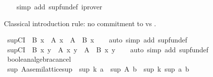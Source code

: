 \begin{isabellebody}
%
\isadelimproof
\ \ %
\endisadelimproof
%
\isatagproof
{}\isamarkupfalse%
\ {\isacharparenleft}{\kern0pt}simp\ add{\isacharcolon}{\kern0pt}\ sup{\isacharunderscore}{\kern0pt}fun{\isacharunderscore}{\kern0pt}def{\isacharparenright}{\kern0pt}\ iprover%
\endisatagproof
{\isafoldproof}%
%
\isadelimproof
%
\endisadelimproof
%
\begin{isamarkuptext}%
\medskip Classical introduction rule: no commitment to  vs .%
\end{isamarkuptext}\isamarkuptrue%
\isamarkupfalse%
\ sup{}CI{\isacharcolon}{\kern0pt}\ {\isachardoublequoteopen}{\isacharparenleft}{\kern0pt}{\isasymnot}\ B\ x\ {\isasymLongrightarrow}\ A\ x{\isacharparenright}{\kern0pt}\ {\isasymLongrightarrow}\ {\isacharparenleft}{\kern0pt}A\ {\isasymsqunion}\ B{\isacharparenright}{\kern0pt}\ x{\isachardoublequoteclose}\isanewline
%
\isadelimproof
\ \ %
\endisadelimproof
%
\isatagproof
{}\isamarkupfalse%
\ {\isacharparenleft}{\kern0pt}auto\ simp\ add{\isacharcolon}{\kern0pt}\ sup{\isacharunderscore}{\kern0pt}fun{\isacharunderscore}{\kern0pt}def{\isacharparenright}{\kern0pt}%
\endisatagproof
{\isafoldproof}%
%
\isadelimproof
\isanewline
%
\endisadelimproof
\isanewline
{}\isamarkupfalse%
\ sup{}CI{\isacharcolon}{\kern0pt}\ {\isachardoublequoteopen}{\isacharparenleft}{\kern0pt}{\isasymnot}\ B\ x\ y\ {\isasymLongrightarrow}\ A\ x\ y{\isacharparenright}{\kern0pt}\ {\isasymLongrightarrow}\ {\isacharparenleft}{\kern0pt}A\ {\isasymsqunion}\ B{\isacharparenright}{\kern0pt}\ x\ y{\isachardoublequoteclose}\isanewline
%
\isadelimproof
\ \ %
\endisadelimproof
%
\isatagproof
{}\isamarkupfalse%
\ {\isacharparenleft}{\kern0pt}auto\ simp\ add{\isacharcolon}{\kern0pt}\ sup{\isacharunderscore}{\kern0pt}fun{\isacharunderscore}{\kern0pt}def{\isacharparenright}{\kern0pt}%
\endisatagproof
{\isafoldproof}%
%
\isadelimproof
%
\endisadelimproof
%
\isadelimdocument
%
\endisadelimdocument
%
\isatagdocument
%
\isamarkuptrue%
%
\endisatagdocument
{\isafolddocument}%
%
\isadelimdocument
%
\endisadelimdocument
{}\isamarkupfalse%
\ boolean{\isacharunderscore}{\kern0pt}algebra{\isacharunderscore}{\kern0pt}cancel\isanewline
{}\isanewline
\isanewline
{}\isamarkupfalse%
\ sup{}{\isacharcolon}{\kern0pt}\ {\isachardoublequoteopen}{\isacharparenleft}{\kern0pt}A{\isacharcolon}{\kern0pt}{\isacharcolon}{\kern0pt}{\isacharprime}{\kern0pt}a{\isacharcolon}{\kern0pt}{\isacharcolon}{\kern0pt}semilattice{\isacharunderscore}{\kern0pt}sup{\isacharparenright}{\kern0pt}\ {\isasymequiv}\ sup\ k\ a\ {\isasymLongrightarrow}\ sup\ A\ b\ {\isasymequiv}\ sup\ k\ {\isacharparenleft}{\kern0pt}sup\ a\ b{\isacharparenright}{\kern0pt}{\isachardoublequoteclose}\isanewline

\end{isabellebody}
